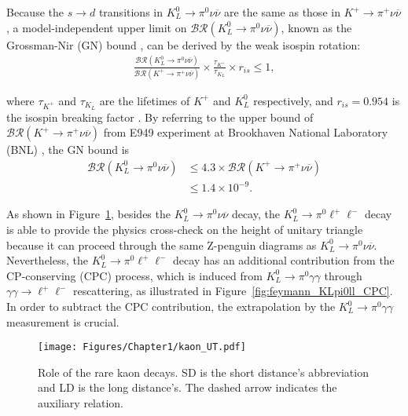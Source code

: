%


Because the ${s \to d}$ transitions in ${K_L^0 \to \pi^0 \nu \overline{\nu}}$ are the same as those in $K^+\to\pi^+\nu\overline{\nu}$, a model-independent upper limit on ${\mathcal{BR}(K_L^0 \to \pi^0 \nu \overline{\nu})}$, known as the Grossman-Nir (GN) bound \parencite{GN}, can be derived by the weak isospin rotation:
%
\vspace{1em}
\begin{align}
\frac{\mathcal{BR}(K_L^0 \to \pi^0 \nu \overline{\nu})}{\mathcal{BR}(K^+ \to \pi^+ \nu \overline{\nu})} \times \frac{\tau_{K^+}}{\tau_{K_L}} \times r_{is}  \leq 1 ,
\end{align}

\noindent
where $\tau_{K^+}$ and $\tau_{K_L}$ are the lifetimes of $K^+$ and $K_L^0$ respectively, and $r_{is} = 0.954$ is the isospin breaking factor \parencite{GN_correction}. By referring to the upper bound of ${\mathcal{BR}(K^+ \to \pi^+ \nu \overline{\nu})}$ from E949 experiment at Brookhaven National Laboratory (BNL) \parencite{Kpinn_BNL}, the GN bound is
%
\vspace{1em}
\begin{align}
\mathcal{BR}(K_L^0 \to \pi^0 \nu \overline{\nu}) 
&\leq 4.3 \times \mathcal{BR}(K^+ \to \pi^+ \nu \overline{\nu}) \label{eq:gn_bound} \\
&\leq 1.4 \times 10^{-9}.
\end{align}

%

As shown in Figure~\ref{fig:unitary_kaon}, besides the ${K_L^0 \to \pi^0 \nu \overline{\nu}}$ decay, the ${K_L^0 \to \pi^0 \ell^+ \ell^-}$ decay is able to provide the physics cross-check on the height of unitary triangle because it can proceed through the same Z-penguin diagrams as ${K_L^0 \to \pi^0 \nu \overline{\nu}}$. Nevertheless, the ${K_L^0 \to \pi^0 \ell^+ \ell^-}$ decay has an additional contribution from the CP-conserving (CPC) process, which is induced from ${K_L^0 \to \pi^0 \gamma \gamma}$ through $\gamma\gamma \to \ell^+ \ell^-$ rescattering, as illustrated in Figure~\ref{fig:feymann_KLpi0ll_CPC}. In order to subtract the CPC contribution, the extrapolation by the ${K_L^0 \to \pi^0 \gamma \gamma}$ measurement is crucial.

\begin{figure}[h]
\begin{center}
\captionsetup{width=.99\linewidth}
\texttt{[image: Figures/Chapter1/kaon\_UT.pdf]}
\caption[Role of the rare kaon decays.]{Role of the rare kaon decays. SD is the short distance's abbreviation and LD is the long distance's. The dashed arrow indicates the auxiliary relation.}
\label{fig:unitary_kaon}
\end{center}
\end{figure}

